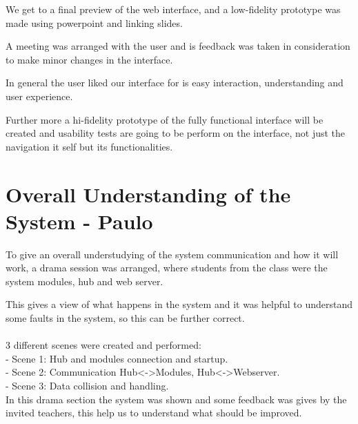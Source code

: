 We get to a final preview of the web interface, and a low-fidelity prototype was made using powerpoint and linking slides. 

A meeting was arranged with the user and is feedback was taken in consideration to make minor changes in the interface.

In general the user liked our interface for is easy interaction, understanding and user experience.

Further more a hi-fidelity prototype of the fully functional interface will be created and usability tests are going to be perform on the interface, not just the navigation it self but its functionalities.

\section{Overall Understanding of the System - Paulo} 

To give an overall understudying of the system communication and how it will work, a drama session was arranged, where students from the class were the system modules, hub and web server.

This gives a view of what happens in the system and it was helpful to understand some faults in the system, so this can be further correct.
\\
\\3 different scenes were created and performed:\\
- Scene 1: Hub and modules connection and startup.\\
- Scene 2: Communication Hub<->Modules, Hub<->Webserver.\\
- Scene 3: Data collision and handling.\\

In this drama section the system was shown and some feedback was gives by the invited teachers, this help us to understand what should be improved.